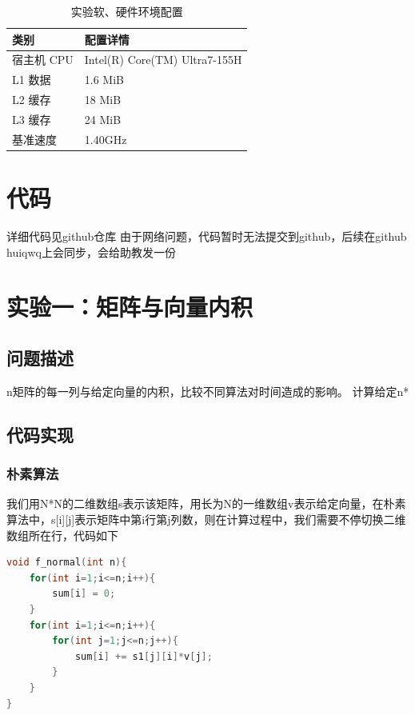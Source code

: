 \documentclass[a4paper]{article}
\begin{document}
\begin{table}[htbp]
  \centering
  \caption{实验软、硬件环境配置}
  \label{tab:env_config}
  
  \begin{tabular}{l l}
    \toprule
    类别         & 配置详情 \\
    \midrule
    宿主机 CPU   & Intel(R) Core(TM) Ultra7-155H \\
    L1 数据  & 1.6 MiB   \\
    L2 缓存      & 18 MiB\\
    L3 缓存  & 24 MiB  \\
    基准速度 & 1.40GHz \\
    \bottomrule
  \end{tabular}
\end{table}
\section{代码}
详细代码见github仓库  由于网络问题，代码暂时无法提交到github，后续在github huiqwq上会同步，会给助教发一份

\section{实验一：矩阵与向量内积}

\subsection{问题描述}
n矩阵的每一列与给定向量的内积，比较不同算法对时间造成的影响。
计算给定n*

\subsection{代码实现}

\subsubsection{朴素算法}
我们用N*N的二维数组s表示该矩阵，用长为N的一维数组v表示给定向量，在朴素算法中，s[i][j]表示矩阵中第i行第j列数，则在计算过程中，我们需要不停切换二维数组所在行，代码如下

\begin{lstlisting}[title=逐列访问平凡算法,frame=trbl,language={C++}]
void f_normal(int n){
	for(int i=1;i<=n;i++){
		sum[i] = 0;
	}
	for(int i=1;i<=n;i++){
		for(int j=1;j<=n;j++){
			sum[i] += s1[j][i]*v[j];	
		}
	}
}

\end{lstlisting}
\end{document}

